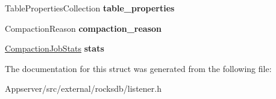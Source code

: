 \begin{DoxyCompactItemize}
\item 
Table\+Properties\+Collection {\bfseries table\+\_\+properties}\hypertarget{structrocksdb_1_1CompactionJobInfo_ad2afb3bdbf47e8a94a646bc51500f800}{}\label{structrocksdb_1_1CompactionJobInfo_ad2afb3bdbf47e8a94a646bc51500f800}

\item 
Compaction\+Reason {\bfseries compaction\+\_\+reason}\hypertarget{structrocksdb_1_1CompactionJobInfo_a55ed52084f36f0456a21794c2d9ba547}{}\label{structrocksdb_1_1CompactionJobInfo_a55ed52084f36f0456a21794c2d9ba547}

\item 
\hyperlink{structrocksdb_1_1CompactionJobStats}{Compaction\+Job\+Stats} {\bfseries stats}\hypertarget{structrocksdb_1_1CompactionJobInfo_a393e4d0075f482bdcca653e308a67f64}{}\label{structrocksdb_1_1CompactionJobInfo_a393e4d0075f482bdcca653e308a67f64}

\end{DoxyCompactItemize}


The documentation for this struct was generated from the following file\+:\begin{DoxyCompactItemize}
\item 
Appserver/src/external/rocksdb/listener.\+h\end{DoxyCompactItemize}
